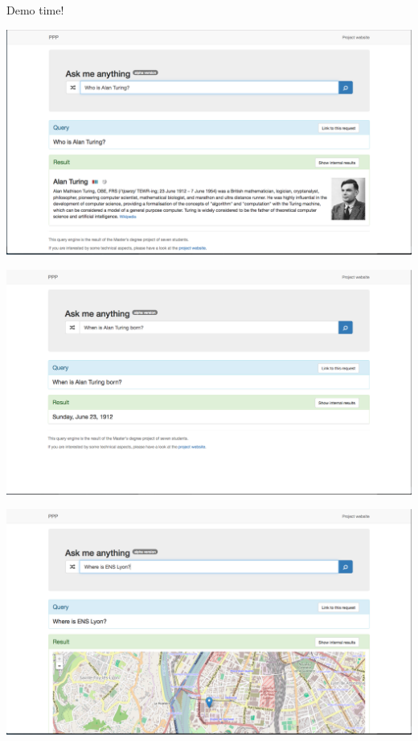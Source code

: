 \begin{frame}
    \begin{center}
        \Huge Demo time!
    \end{center}
\end{frame}

\begin{frame}[plain]
    \includegraphics[width=\linewidth]{figures/demo-whoIsAlanTuring.png}
\end{frame}

\begin{frame}[plain]
    \includegraphics[width=\linewidth]{figures/demo-whenIsAlanTuringBorn.png}
\end{frame}

\begin{frame}[plain]
    \includegraphics[width=\linewidth]{figures/demo-whereIsEnsLyon.png}
\end{frame}
